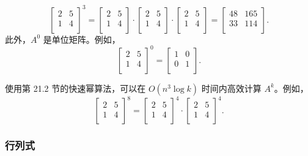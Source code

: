 \[
 \begin{bmatrix}
  2 & 5 \\
  1 & 4 \\
 \end{bmatrix}^3 =
 \begin{bmatrix}
  2 & 5 \\
  1 & 4 \\
 \end{bmatrix} \cdot
 \begin{bmatrix}
  2 & 5 \\
  1 & 4 \\
 \end{bmatrix} \cdot
 \begin{bmatrix}
  2 & 5 \\
  1 & 4 \\
 \end{bmatrix} =
 \begin{bmatrix}
  48 & 165 \\
  33 & 114 \\
 \end{bmatrix}.
\]
此外，$A^0$ 是单位矩阵。例如，
\[
 \begin{bmatrix}
  2 & 5 \\
  1 & 4 \\
 \end{bmatrix}^0 =
 \begin{bmatrix}
  1 & 0 \\
  0 & 1 \\
 \end{bmatrix}.
\]

使用第 21.2 节的快速幂算法，可以在 $O(n^3 \log k)$ 时间内高效计算 $A^k$。例如，
\[
 \begin{bmatrix}
  2 & 5 \\
  1 & 4 \\
 \end{bmatrix}^8 =
 \begin{bmatrix}
  2 & 5 \\
  1 & 4 \\
 \end{bmatrix}^4 \cdot
 \begin{bmatrix}
  2 & 5 \\
  1 & 4 \\
 \end{bmatrix}^4.
\]

\subsubsection{行列式}


